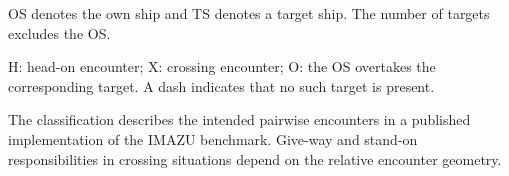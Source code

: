 \documentclass[10pt]{reportMaster}
\begin{document}
\begin{table}[t]
\begin{threeparttable}
\begin{tabular}{@{}c c c c c@{}}
\bottomrule
\end{tabular}

\begin{tablenotes}[flushleft]
\footnotesize
\item OS denotes the own ship and TS denotes a
target ship. The number of targets excludes the OS.
\item H: head-on encounter; X: crossing encounter;
O: the OS overtakes the corresponding target.
A dash indicates that no such target is present.
\item The classification describes the intended
pairwise encounters in a published implementation
of the IMAZU benchmark. Give-way and stand-on
responsibilities in crossing situations depend
on the relative encounter geometry.
\end{tablenotes}

\end{threeparttable}
\end{table}
\end{document}
